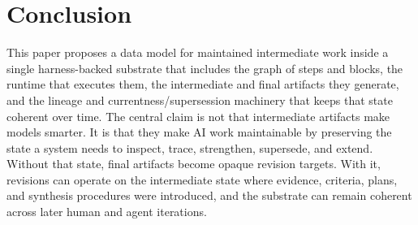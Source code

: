 \documentclass{article}
\begin{document}
\section{Conclusion}

This paper proposes a data model for maintained intermediate work inside a single harness-backed substrate that includes the graph of steps and blocks, the runtime that executes them, the intermediate and final artifacts they generate, and the lineage and currentness/supersession machinery that keeps that state coherent over time. The central claim is not that intermediate artifacts make models smarter. It is that they make AI work maintainable by preserving the state a system needs to inspect, trace, strengthen, supersede, and extend. Without that state, final artifacts become opaque revision targets. With it, revisions can operate on the intermediate state where evidence, criteria, plans, and synthesis procedures were introduced, and the substrate can remain coherent across later human and agent iterations.
\end{document}
